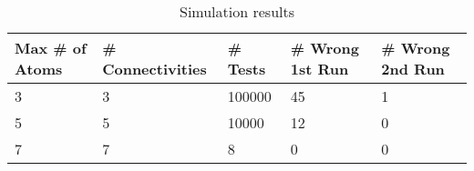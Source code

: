 \begin{table}[h!]
\centering
\begin{tabularx}{\textwidth}{|X|X|X|X|X|}
\hline
Max \# of Atoms & \# Connectivities & \# Tests &  \# Wrong 1st Run & \# Wrong 2nd Run \\
\hline
3 & 3 & 100000 & 45 & 1 \\
5 & 5 &  10000 & 12 & 0 \\
7 & 7 &      8 &  0 & 0 \\
\hline
\end{tabularx}
\caption{Simulation results}
\label{table:sim-results}
\end{table}
